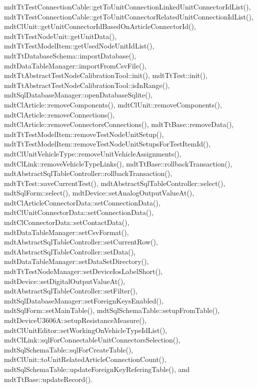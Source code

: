 mdt\-Tt\-Test\-Connection\-Cable\-::get\-To\-Unit\-Connection\-Linked\-Unit\-Connector\-Id\-List(), mdt\-Tt\-Test\-Connection\-Cable\-::get\-To\-Unit\-Connector\-Related\-Unit\-Connection\-Id\-List(), mdt\-Cl\-Unit\-::get\-Unit\-Connector\-Id\-Based\-On\-Article\-Connector\-Id(), mdt\-Tt\-Test\-Node\-Unit\-::get\-Unit\-Data(), mdt\-Tt\-Test\-Model\-Item\-::get\-Used\-Node\-Unit\-Id\-List(), mdt\-Tt\-Database\-Schema\-::import\-Database(), mdt\-Data\-Table\-Manager\-::import\-From\-Csv\-File(), mdt\-Tt\-Abstract\-Test\-Node\-Calibration\-Tool\-::init(), mdt\-Tt\-Test\-::init(), mdt\-Tt\-Abstract\-Test\-Node\-Calibration\-Tool\-::is\-In\-Range(), mdt\-Sql\-Database\-Manager\-::open\-Database\-Sqlite(), mdt\-Cl\-Article\-::remove\-Components(), mdt\-Cl\-Unit\-::remove\-Components(), mdt\-Cl\-Article\-::remove\-Connections(), mdt\-Cl\-Article\-::remove\-Connectors\-Connections(), mdt\-Tt\-Base\-::remove\-Data(), mdt\-Tt\-Test\-Model\-Item\-::remove\-Test\-Node\-Unit\-Setup(), mdt\-Tt\-Test\-Model\-Item\-::remove\-Test\-Node\-Unit\-Setups\-For\-Test\-Item\-Id(), mdt\-Cl\-Unit\-Vehicle\-Type\-::remove\-Unit\-Vehicle\-Assignments(), mdt\-Cl\-Link\-::remove\-Vehicle\-Type\-Links(), mdt\-Tt\-Base\-::rollback\-Transaction(), mdt\-Abstract\-Sql\-Table\-Controller\-::rollback\-Transaction(), mdt\-Tt\-Test\-::save\-Current\-Test(), mdt\-Abstract\-Sql\-Table\-Controller\-::select(), mdt\-Sql\-Form\-::select(), mdt\-Device\-::set\-Analog\-Output\-Value\-At(), mdt\-Cl\-Article\-Connector\-Data\-::set\-Connection\-Data(), mdt\-Cl\-Unit\-Connector\-Data\-::set\-Connection\-Data(), mdt\-Cl\-Connector\-Data\-::set\-Contact\-Data(), mdt\-Data\-Table\-Manager\-::set\-Csv\-Format(), mdt\-Abstract\-Sql\-Table\-Controller\-::set\-Current\-Row(), mdt\-Abstract\-Sql\-Table\-Controller\-::set\-Data(), mdt\-Data\-Table\-Manager\-::set\-Data\-Set\-Directory(), mdt\-Tt\-Test\-Node\-Manager\-::set\-Device\-Ios\-Label\-Short(), mdt\-Device\-::set\-Digital\-Output\-Value\-At(), mdt\-Abstract\-Sql\-Table\-Controller\-::set\-Filter(), mdt\-Sql\-Database\-Manager\-::set\-Foreign\-Keys\-Enabled(), mdt\-Sql\-Form\-::set\-Main\-Table(), mdt\-Sql\-Schema\-Table\-::setup\-From\-Table(), mdt\-Device\-U3606\-A\-::setup\-Resistance\-Measure(), mdt\-Cl\-Unit\-Editor\-::set\-Working\-On\-Vehicle\-Type\-Id\-List(), mdt\-Cl\-Link\-::sql\-For\-Connectable\-Unit\-Connectors\-Selection(), mdt\-Sql\-Schema\-Table\-::sql\-For\-Create\-Table(), mdt\-Cl\-Unit\-::to\-Unit\-Related\-Article\-Connection\-Count(), mdt\-Sql\-Schema\-Table\-::update\-Foreign\-Key\-Refering\-Table(), and mdt\-Tt\-Base\-::update\-Record().

